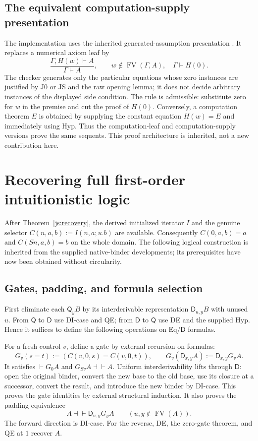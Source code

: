 \documentclass[11pt,letterpaper]{article}
\theoremstyle{definition}\newtheorem{definition}[theorem]{Definition}
\theoremstyle{remark}\newtheorem{remark}[theorem]{Remark}
\newcommand{\D}{\mathsf D}
\newcommand{\Q}{\mathsf Q}
\newcommand{\FV}{\operatorname{FV}}
\begin{document}
\subsection{The equivalent computation-supply presentation}
The implementation uses the inherited generated-assumption presentation
\cite{generated}. It replaces a numerical axiom leaf by
\[
 \frac{\Gamma,H(w)\vdash A}{\Gamma\vdash A},\qquad
 w\notin\FV(\Gamma,A),\quad \Gamma\vdash H(0).
 \tag{Known-instance supply}
\]
The checker generates only the particular equations whose zero instances
are justified by J0 or JS and the raw opening lemma; it does not decide
arbitrary instances of the displayed side condition. The rule is
admissible: substitute zero for $w$ in the premise and cut the proof of
$H(0)$. Conversely, a computation theorem $E$ is obtained by supplying
the constant equation $H(w)=E$ and immediately using Hyp. Thus the
computation-leaf and computation-supply versions prove the same sequents.
This proof architecture is inherited, not a new contribution here.




\section{Recovering full first-order intuitionistic logic}
\label{sec:choice-introduction}
After Theorem~\ref{js:recovery}, the derived initialized iterator $I$ and
the genuine selector $C(n,a,b):=I(n,a;u.b)$ are available. Consequently
$C(0,a,b)=a$ and $C(Sn,a,b)=b$ on the whole domain. The following
logical construction is inherited from the supplied native-binder
developments\cite{generated,elimination}; its prerequisites have now
been obtained without circularity.

\subsection{Gates, padding, and formula selection}
First eliminate each $\Q_yB$ by its interderivable representation
$\D_{u,y}B$ with unused $u$. From $\Q$ to $\D$ use DI-case and QE;
from $\D$ to $\Q$ use DE and the supplied Hyp. Hence it suffices to
define the following operations on Eq/$\D$ formulas.

For a fresh control $v$, define a gate by external recursion on formulas:
\[
 G_v(s=t):=(C(v,0,s)=C(v,0,t)),\qquad
 G_v(\D_{x,y}A):=\D_{x,y}G_vA.
\]
It satisfies $\vdash G_0A$ and $G_{Sv}A\dashv\vdash A$.
Uniform interderivability lifts through $\D$: open the original binder,
convert the new base to the old base, use its closure at a successor,
convert the result, and introduce the new binder by DI-case.
This proves the gate identities by external structural induction.
It also proves the padding equivalence
\[
 A\dashv\vdash\D_{u,y}G_yA\qquad(u,y\notin\FV(A)).
\]
The forward direction is DI-case. For the reverse, DE, the zero-gate
theorem, and QE at $1$ recover $A$.
\end{document}
